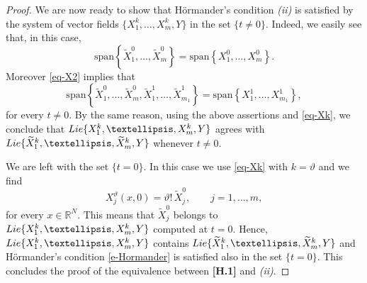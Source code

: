 \documentclass{amsart}
\numberwithin{equation}{section}
\def \R {{\mathbb {R}}}
\begin{document}
{\begin{proof}
We are now ready to show that H\"ormander's condition {\it (ii)} is satisfied by the system of vector fields $\{ X^k_1, \dots, X^k_m, Y \}$ in the set $\{t \ne 0 \}$. Indeed, we easily see that, in this case,
\begin{equation*}
	\text{span} \left\{ \widetilde X^0_1, \dots, \widetilde X^0_m \right\} = \text{span} \left\{ X^0_1, \dots, X^0_m \right\}.
\end{equation*}
Moreover \eqref{eq-X2} implies that 
\begin{equation*}
	\text{span} \left\{ \widetilde X^0_1, \dots, \widetilde X^0_m, \widetilde X^1_1, \dots, \widetilde X^1_{m_1} \right\} = \text{span} \left\{ X^1_1, \dots, X^1_{m_1} \right\},
\end{equation*}
for every $t \ne 0$. By the same reason, using the above assertions and \eqref{eq-Xk}, we conclude that ${\rm Lie}\{ X^k_1, \dots, X^k_m, Y \}$ agrees with ${\rm Lie}\{ \widetilde X^k_1, \dots, \widetilde X^k_m, Y \}$ whenever $t \ne 0$.
	
We are left with the set $\{t=0 \}$. In this case we use \eqref{eq-Xk} with $k = \vartheta$ and we find 
\begin{equation*} %
	X_j^\vartheta (x,0) =  \vartheta ! \, \widetilde X_j^0, \qquad j=1, \dots, m,
\end{equation*}
for every $x \in \R^N$. This means that $\widetilde X_j^0$ belongs to ${\rm Lie}\{ X^k_1, \dots, X^k_m, Y \}$ computed at $t=0$. Hence, ${\rm Lie}\{ X^k_1, \dots, X^k_m, Y \}$ contains ${\rm Lie}\{ \widetilde X^k_1, \dots, \widetilde X^k_m, Y \}$ and H\"ormander's condition \eqref{e-Hormander} is satisfied also in the set $\{t=0 \}$. This concludes the proof of the equivalence between  {\bf[H.1]} and {\it (ii)}.

\medskip


\end{proof}}
\end{document}
